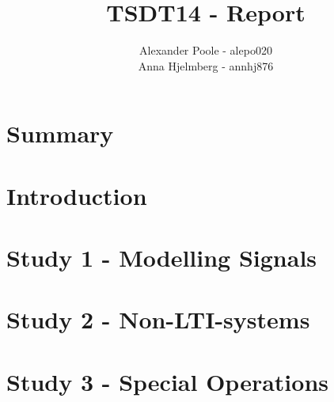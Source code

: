 \documentclass[a4paper,12pt]{article}
\title{TSDT14 - Report}
\author{Alexander Poole - alepo020 \\ Anna Hjelmberg - annhj876}
\begin{document}
\maketitle
	\thispagestyle{empty}
\newpage

\section{Summary}

\newpage
\tableofcontents
\newpage



\section{Introduction}

\section{Study 1 - Modelling Signals}

\section{Study 2 - Non-LTI-systems}

\section{Study 3 - Special Operations}
\end{document}
